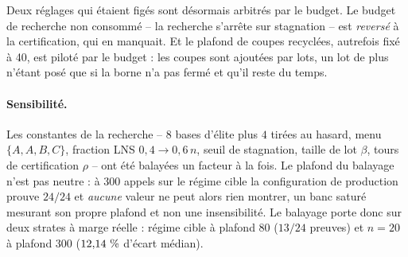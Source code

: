 \documentclass[11pt,a4paper]{article}
\theoremstyle{plain}
\theoremstyle{remark}
\begin{document}
Deux réglages qui étaient figés sont désormais arbitrés par le budget.
Le budget de recherche non consommé -- la recherche s'arrête sur stagnation --
est \emph{reversé} à la certification, qui en manquait. Et le plafond de
coupes recyclées, autrefois fixé à 40, est piloté par le budget : les coupes
sont ajoutées par lots, un lot de plus n'étant posé que si la borne n'a pas
fermé et qu'il reste du temps.

\paragraph{Sensibilité.} Les constantes de la recherche -- $8$ bases
d'élite plus $4$ tirées au hasard, menu $\{A,A,B,C\}$, fraction LNS
$0{,}4\to0{,}6\,n$, seuil de stagnation, taille de lot $\beta$, tours de
certification $\rho$ -- ont été balayées un facteur à la fois. Le plafond du
balayage n'est pas neutre : à $300$ appels sur le régime cible la
configuration de production prouve $24/24$ et \emph{aucune} valeur ne peut
alors rien montrer, un banc saturé mesurant son propre plafond et non une
insensibilité. Le balayage porte donc sur deux strates à marge réelle :
régime cible à plafond $80$ ($13/24$ preuves) et $n=20$ à plafond $300$
($12{,}14{}\ \%$ d'écart médian).
\end{document}
